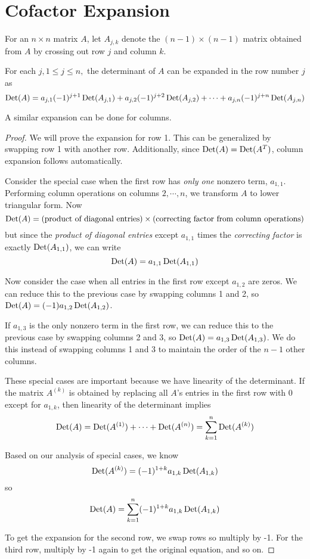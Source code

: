 \section{Cofactor Expansion}

For an $n \times n$ matrix $A$, let $A_{j, k}$ denote the $(n - 1) \times (n - 1)$ matrix obtained from $A$ by crossing out row $j$ and column $k$. 

\begin{theorem}
For each $j, 1 \leq j \leq n,$ the determinant of $A$ can be expanded in the row number $j$ as 
$$\operatorname{Det}(A) = a_{j, 1} (-1)^{j+1} \operatorname{Det}(A_{j, 1}) + a_{j, 2} (-1)^{j+2} \operatorname{Det}(A_{j, 2}) + \cdots + a_{j, n} (-1)^{j + n} \operatorname{Det}(A_{j, n})$$

A similar expansion can be done for columns. 
\end{theorem}

\begin{proof}
We will prove the expansion for row 1. This can be generalized by swapping row 1 with another row. Additionally, since $\operatorname{Det}(A) = \operatorname{Det}(A^{T})$, column expansion follows automatically. 

Consider the special case when the first row has \textit{only one} nonzero term, $a_{1, 1}$. Performing column operations on columns $2, \cdots, n$, we transform $A$ to lower triangular form. Now
$$\operatorname{Det}(A) = (\text{product of diagonal entries}) \times (\text{correcting factor from column operations})$$
but since the \textit{product of diagonal entries} except $a_{1,1}$ times the \textit{correcting factor} is exactly $\operatorname{Det}(A_{1,1})$, we can write 
$$\operatorname{Det}(A) = a_{1,1} \operatorname{Det}(A_{1,1})$$

Now consider the case when all entries in the first row except $a_{1,2}$ are zeros. We can reduce this to the previous case by swapping columns 1 and 2, so $\operatorname{Det}(A) = (-1) a_{1,2} \operatorname{Det}(A_{1,2})$. 

If $a_{1,3}$ is the only nonzero term in the first row, we can reduce this to the previous case by swapping columns 2 and 3, so $\operatorname{Det}(A) = a_{1,3} \operatorname{Det}(A_{1,3})$. We do this instead of swapping columns 1 and 3 to maintain the order of the $n-1$ other columns. 

These special cases are important because we have linearity of the determinant. If the matrix $A^{(k)}$ is obtained by replacing all $A$'s entries in the first row with 0 except for $a_{1,k}$, then linearity of the determinant implies 
$$\operatorname{Det}(A) = \operatorname{Det}(A^{(1)}) + \cdots + \operatorname{Det}(A^{(n)}) = \sum_{k=1}^{n} \operatorname{Det}(A^{(k)})$$

Based on our analysis of special cases, we know 
$$\operatorname{Det}(A^{(k)}) = (-1)^{1 + k} a_{1, k} \operatorname{Det}(A_{1, k})$$ 
so 
$$\operatorname{Det}(A) = \sum_{k=1}^{n} (-1)^{1 + k} a_{1, k} \operatorname{Det}(A_{1,k})$$

To get the expansion for the second row, we swap rows so multiply by -1. For the third row, multiply by -1 again to get the original equation, and so on. 
\end{proof}

